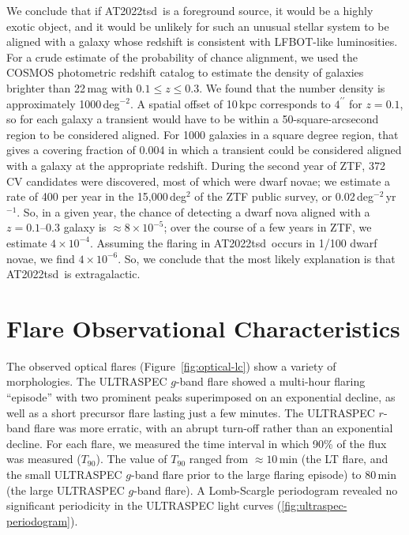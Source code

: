 \documentclass{nature_plusfigure}
\newcommand{\at}{AT2022tsd}
\begin{document}
\begin{methods}
We conclude that if \at\ is a foreground source, it would be a highly exotic object, and it would be unlikely for such an unusual stellar system to be aligned with a galaxy whose redshift is consistent with LFBOT-like luminosities.
For a crude estimate of the probability of chance alignment, we used the COSMOS photometric redshift catalog\cite{Ilbert2008} to estimate the density of galaxies brighter than 22\,mag with $0.1 \leq z \leq 0.3$. We found that the number density is approximately 1000\,deg$^{-2}$.
A spatial offset of 10\,kpc corresponds to $4^{\prime\prime}$ for $z=0.1$, so for each galaxy a transient would have to be within a 50-square-arcsecond region to be considered aligned. For 1000 galaxies in a square degree region, that gives a covering fraction of 0.004 in which a transient could be considered aligned with a galaxy at the appropriate redshift.
During the second year of ZTF, 372 CV candidates were discovered\cite{Szkody2021}, most of which were dwarf novae; we estimate a rate of 400 per year in the 15,000\,deg$^{2}$ of the ZTF public survey, or 0.02\,deg$^{-2}$\,yr$^{-1}$. So, in a given year, the chance of detecting a dwarf nova aligned with a $z=0.1$--0.3 galaxy is $\approx 8\times10^{-5}$; over the course of a few years in ZTF, we estimate $4\times10^{-4}$. Assuming the flaring in \at\ occurs in 1/100 dwarf novae, we find $4\times10^{-6}$.
So, we conclude that the most likely explanation is that \at\ is extragalactic.

\section{Flare Observational Characteristics}
\label{sec:flare-characteristics}

The observed optical flares (Figure~\ref{fig:optical-lc}) show a variety of morphologies. The ULTRASPEC $g$-band flare showed a multi-hour flaring ``episode'' with two prominent peaks superimposed on an exponential decline, as well as a short precursor flare lasting just a few minutes. The ULTRASPEC $r$-band flare was more erratic, with an abrupt turn-off rather than an exponential decline. For each flare, we measured the time interval in which 90\% of the flux was measured ($T_{90}$). The value of $T_{90}$ ranged from $\approx10$\,min (the LT flare, and the small ULTRASPEC $g$-band flare prior to the large flaring episode) to 80\,min (the large ULTRASPEC $g$-band flare). A Lomb-Scargle periodogram\cite{Lomb1976,Scargle1982} revealed no significant periodicity in the ULTRASPEC light curves (\ref{fig:ultraspec-periodogram}).


\end{methods}
\end{document}
